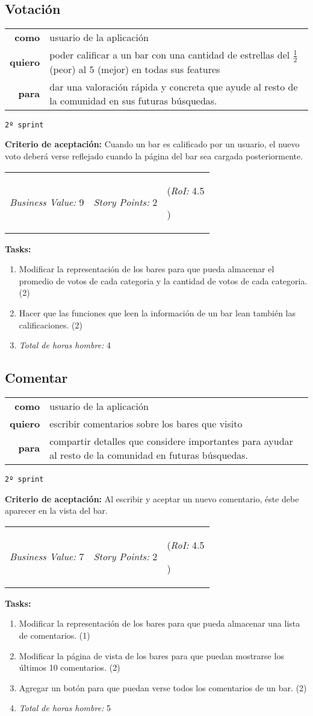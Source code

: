 \documentclass[hidelinks,a4paper,11pt, nofootinbib]{article}
\newcommand{\userstory}[3]{
\begin{tabular}{|r p{10cm}|}
  \hline
  \textbf{como} & #1 \\
  \textbf{quiero} & #2 \\
  \textbf{para} & #3 \\
  \hline
\end{tabular}

}
\newcommand{\critdeacep}[1]{\textbf{Criterio de aceptación:} #1

}
\newcommand{\busvalue}[1]{\textit{Business Value:} #1

}
\newcommand{\storypoints}[1]{\textit{Story Points:} #1

}
\newcommand{\roi}[1]{\textit{RoI:} #1

}
\newcommand{\valores}[3]{
\begin{tabular}{l l l}
  \busvalue{#1} & \storypoints{#2} & (\roi{#3}) \\ 
\end{tabular}

}
\newcommand{\segundosprint}{\texttt{2º sprint}

}
\newcommand{\tasks}[1]{\textbf{Tasks:} 

#1}
\begin{document}
\subsection*{Votación}
\userstory{usuario de la aplicación}{poder calificar a un bar con una cantidad de estrellas del $\frac{1}{2}$ (peor) al $5$ (mejor) en todas sus features}{dar una valoración rápida y concreta que ayude al resto de la comunidad en sus futuras búsquedas.}
\segundosprint
\critdeacep{Cuando un bar es calificado por un usuario, el nuevo voto deberá verse reflejado cuando la página del bar sea cargada posteriormente.}
\valores{9}{2}{4.5}
\tasks{
  \begin{enumerate}
    \item Modificar la representación de los bares para que pueda almacenar el promedio de votos de cada categoria y la cantidad de votos de cada categoria. (2)
    \item Hacer que las funciones que leen la información de un bar lean también las calificaciones. (2)
    \item[] \textit{Total de horas hombre:} 4
  \end{enumerate}
}

\subsection*{Comentar}
\userstory{usuario de la aplicación}{escribir comentarios sobre los bares que visito}{compartir detalles que considere importantes para ayudar al resto de la comunidad en futuras búsquedas.}
\segundosprint
\critdeacep{Al escribir y aceptar un nuevo comentario, éste debe aparecer en la vista del bar.}
\valores{7}{2}{4.5}
\tasks{
  \begin{enumerate}
    \item Modificar la representación de los bares para que pueda almacenar una lista de comentarios. (1)
    \item Modificar la página de vista de los bares para que puedan mostrarse los últimos 10 comentarios. (2)
    \item Agregar un botón para que puedan verse todos los comentarios de un bar. (2)
    \item[] \textit{Total de horas hombre:} 5
  \end{enumerate}
}
\end{document}
